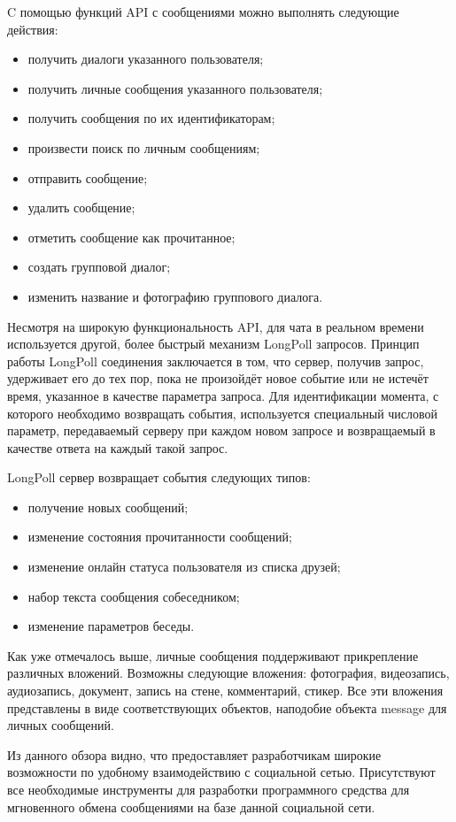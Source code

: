 C помощью функций API с сообщениями можно выполнять следующие действия:
\begin{itemize}
  \item получить диалоги указанного пользователя;
  \item получить личные сообщения указанного пользователя;
  \item получить сообщения по их идентификаторам;
  \item произвести поиск по личным сообщениям;
  \item отправить сообщение;
  \item удалить сообщение;
  \item отметить сообщение как прочитанное;
  \item создать групповой диалог;
  \item изменить название и фотографию группового диалога.
\end{itemize}

Несмотря на широкую функциональность API, для чата в реальном времени
используется другой, более быстрый механизм LongPoll запросов. Принцип работы
LongPoll соединения заключается в том, что сервер, получив запрос, удерживает
его до тех пор, пока не произойдёт новое событие или не истечёт время, указанное
в качестве параметра запроса. Для идентификации момента, с которого необходимо
возвращать события, используется специальный числовой параметр,
передаваемый серверу при каждом новом запросе и возвращаемый в качестве ответа
на каждый такой запрос.

LongPoll сервер возвращает события следующих типов:
\begin{itemize}
  \item получение новых сообщений;
  \item изменение состояния прочитанности сообщений;
  \item изменение онлайн статуса пользователя из списка друзей;
  \item набор текста сообщения собеседником;
  \item изменение параметров беседы.
\end{itemize}

Как уже отмечалось выше, личные сообщения поддерживают прикрепление различных
вложений. Возможны следующие вложения: фотография, видеозапись, аудиозапись,
документ, запись на стене, комментарий, стикер. Все эти вложения представлены в
виде соответствующих объектов, наподобие объекта message для личных сообщений.

Из данного обзора видно, что \vk{} предоставляет разработчикам широкие
возможности по удобному взаимодействию с социальной сетью. Присутствуют все
необходимые инструменты для разработки программного средства для мгновенного
обмена сообщениями на базе данной социальной сети.

